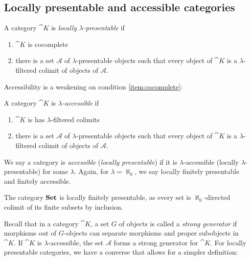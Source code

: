 \subsection{Locally presentable and accessible categories}


\begin{Definition}
A category $\cat K$ is \emph{locally $\lambda$-presentable} if
\begin{enumerate}
\item $\cat K$ is cocomplete \label{item:cocomplete}
\item there is a set $\mathcal A$ of $\lambda$-presentable objects such that every object of $\cat K$ is a $\lambda$-filtered colimit of objects of $\mathcal A$.
\end{enumerate}
\end{Definition}

Accessibility is a weakening on condition \ref{item:cocomplete}:

\begin{Definition}
A category $\cat K$ is \emph{$\lambda$-accessible} if
\begin{enumerate}
\item $\cat K$ is has $\lambda$-filtered colimits
\item there is a set $\mathcal A$ of $\lambda$-presentable objects such that every object of $\cat K$ is a $\lambda$-filtered colimit of objects of $\mathcal A$.
\end{enumerate}
\end{Definition}

We say a category is \emph{accessible} (\emph{locally presentable}) if it is $\lambda$-accessible (locally $\lambda$-presentable) for some $\lambda$. Again, for $\lambda = \aleph_0$, we say locally finitely presentable and finitely accessible. 

\begin{Example}
The category $\mathbf{Set}$ is locally finitely presentable, as every set is $\aleph_0$-directed colimit of its finite subsets by inclusion.
\end{Example}

Recall that in a category $\cat K$, a set $G$ of objects is called a \emph{strong generator} if morphisms out of $G$-objects can separate morphisms and proper subobjects in $\cat K$. If $\cat K$ is $\lambda$-accessible, the set $\mathcal A$ forms a strong generator for $\cat K$. For locally presentable categories, we have a converse that allows for a simpler definition:

